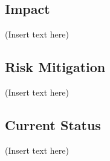 \subsection{Impact}
(Insert text here)

\subsection{Risk Mitigation}
(Insert text here)

\subsection{Current Status}
(Insert text here)

